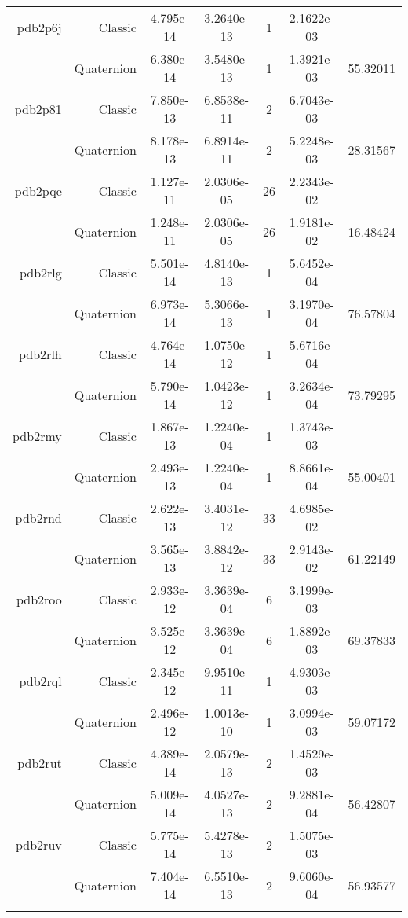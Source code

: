 \begin{xltabular}{\textwidth}{r|rS[table-format=1.3e+2]S[table-format=1.4e+2]cS[table-format=1.4e+2]S[table-format=-1.5]}
pdb2p6j & Classic & 4.795e-14 & 3.2640e-13 & 1 & 2.1622e-03 & \\
& Quaternion & 6.380e-14 & 3.5480e-13 & 1 & 1.3921e-03 & 55.32011\\  \addlinespace
pdb2p81 & Classic & 7.850e-13 & 6.8538e-11 & 2 & 6.7043e-03 & \\
& Quaternion & 8.178e-13 & 6.8914e-11 & 2 & 5.2248e-03 & 28.31567\\  \addlinespace
pdb2pqe & Classic & 1.127e-11 & 2.0306e-05 & 26 & 2.2343e-02 & \\
& Quaternion & 1.248e-11 & 2.0306e-05 & 26 & 1.9181e-02 & 16.48424\\  \addlinespace
pdb2rlg & Classic & 5.501e-14 & 4.8140e-13 & 1 & 5.6452e-04 & \\
& Quaternion & 6.973e-14 & 5.3066e-13 & 1 & 3.1970e-04 & 76.57804\\  \addlinespace
pdb2rlh & Classic & 4.764e-14 & 1.0750e-12 & 1 & 5.6716e-04 & \\
& Quaternion & 5.790e-14 & 1.0423e-12 & 1 & 3.2634e-04 & 73.79295\\  \addlinespace
pdb2rmy & Classic & 1.867e-13 & 1.2240e-04 & 1 & 1.3743e-03 & \\
& Quaternion & 2.493e-13 & 1.2240e-04 & 1 & 8.8661e-04 & 55.00401\\  \addlinespace
pdb2rnd & Classic & 2.622e-13 & 3.4031e-12 & 33 & 4.6985e-02 & \\
& Quaternion & 3.565e-13 & 3.8842e-12 & 33 & 2.9143e-02 & 61.22149\\  \addlinespace
pdb2roo & Classic & 2.933e-12 & 3.3639e-04 & 6 & 3.1999e-03 & \\
& Quaternion & 3.525e-12 & 3.3639e-04 & 6 & 1.8892e-03 & 69.37833\\  \addlinespace
pdb2rql & Classic & 2.345e-12 & 9.9510e-11 & 1 & 4.9303e-03 & \\
& Quaternion & 2.496e-12 & 1.0013e-10 & 1 & 3.0994e-03 & 59.07172\\  \addlinespace
pdb2rut & Classic & 4.389e-14 & 2.0579e-13 & 2 & 1.4529e-03 & \\
& Quaternion & 5.009e-14 & 4.0527e-13 & 2 & 9.2881e-04 & 56.42807\\  \addlinespace
pdb2ruv & Classic & 5.775e-14 & 5.4278e-13 & 2 & 1.5075e-03 & \\
& Quaternion & 7.404e-14 & 6.5510e-13 & 2 & 9.6060e-04 & 56.93577\\  \addlinespace

\end{xltabular}
